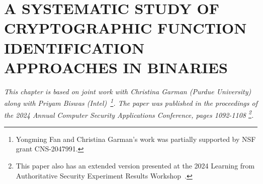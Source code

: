 \chapter{A SYSTEMATIC STUDY OF CRYPTOGRAPHIC FUNCTION IDENTIFICATION APPROACHES IN BINARIES}
\label{ch:cryptobinary}

\textit{This chapter is based on joint work with Christina Garman (Purdue University) along with Priyam Biswas (Intel)~\footnote{Yongming Fan and Christina Garman's work was partially supported by NSF grant CNS-2047991.}. The paper was published in the proceedings of the 2024 Annual Computer Security Applications Conference, pages 1092-1108 \cite{fan2024r+} \footnote{This paper also has an extended version presented at the 2024 Learning from Authoritative Security Experiment Results Workshop~\cite{fanevaluating}.}.}










